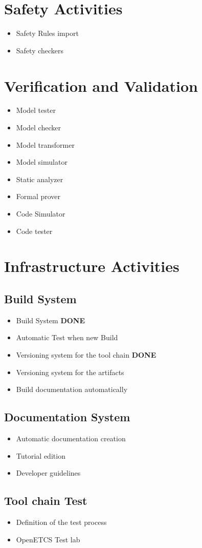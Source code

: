 \documentclass{openetcs_report}
\begin{document}
\section{Safety Activities}
\begin{itemize}
\item Safety Rules import
\item Safety checkers
\end{itemize}

\section{Verification and Validation}
\begin{itemize}
\item Model tester
\item Model checker
\item Model transformer
\item Model simulator
\item Static analyzer
\item Formal prover
\item Code Simulator
\item Code tester
\end{itemize}

\section{Infrastructure Activities}
\label{sec-2-infrastructure}

\subsection{Build System}
\begin{itemize}
\item Build System {\bf DONE}
\item Automatic Test when new Build
\item Versioning system  for the tool chain {\bf DONE}
\item Versioning system for the artifacts
\item Build documentation automatically
\end{itemize}

\subsection{Documentation System}
\begin{itemize}
\item Automatic documentation creation
\item Tutorial  edition
\item Developer guidelines
\end{itemize}

\subsection{Tool chain Test}
\begin{itemize}
\item Definition of the test process
\item OpenETCS Test lab
\end{itemize}
\end{document}
